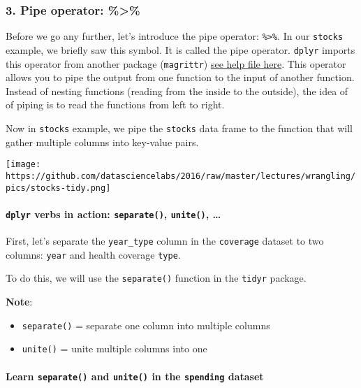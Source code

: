 \documentclass[]{article}
\providecommand{\tightlist}{%
  \setlength{\itemsep}{0pt}\setlength{\parskip}{0pt}}
\let\oldparagraph\paragraph
\renewcommand{\paragraph}[1]{\oldparagraph{#1}\mbox{}}
\begin{document}
\hypertarget{pipe-operator}{%
\subsubsection{3. Pipe operator:
\%\textgreater{}\%}\label{pipe-operator}}

Before we go any further, let's introduce the pipe operator:
\texttt{\%\textgreater{}\%}. In our \texttt{stocks} example, we briefly
saw this symbol. It is called the pipe operator. \texttt{dplyr} imports
this operator from another package (\texttt{magrittr})
\href{http://cran.r-project.org/web/packages/magrittr/vignettes/magrittr.html}{see
help file here}. This operator allows you to pipe the output from one
function to the input of another function. Instead of nesting functions
(reading from the inside to the outside), the idea of of piping is to
read the functions from left to right.

Now in \texttt{stocks} example, we pipe the \texttt{stocks} data frame
to the function that will gather multiple columns into key-value pairs.

\texttt{[image: https://github.com/datasciencelabs/2016/raw/master/lectures/wrangling/pics/stocks-tidy.png]}

\hypertarget{dplyr-verbs-in-action-separate-unite}{%
\paragraph{\texorpdfstring{\texttt{dplyr} verbs in action:
\texttt{separate()}, \texttt{unite()},
\ldots{}}{dplyr verbs in action: separate(), unite(), \ldots{}}}\label{dplyr-verbs-in-action-separate-unite}}

First, let's separate the \texttt{year\_type} column in the
\texttt{coverage} dataset to two columns: \texttt{year} and health
coverage \texttt{type}.

To do this, we will use the \texttt{separate()} function in the
\texttt{tidyr} package.

\textbf{Note}:

\begin{itemize}
\tightlist
\item
  \texttt{separate()} = separate one column into multiple columns
\item
  \texttt{unite()} = unite multiple columns into one
\end{itemize}

\hypertarget{learn-separate-and-unite-in-the-spending-dataset}{%
\paragraph{\texorpdfstring{Learn \texttt{separate()} and
\texttt{unite()} in the \texttt{spending}
dataset}{Learn separate() and unite() in the spending dataset}}\label{learn-separate-and-unite-in-the-spending-dataset}}
\end{document}
